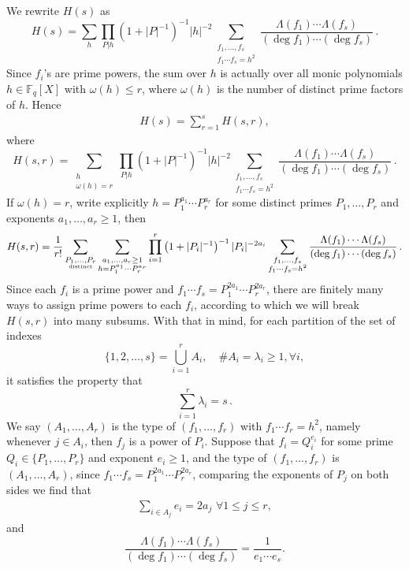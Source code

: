\documentclass[12pt]{amsart}
\theoremstyle{plain}
\newcommand{\F}{{\mathbb F}_q}
\begin{document}
 We rewrite $H(s)$ as
\[H(s)=\sum_{h} \prod_{P|h}\left(1+|P|^{-1}\right)^{-1} |h|^{-2} \sum_{\substack{f_1, \ldots,f_s \\ f_1 \cdots f_s=h^2}} \frac{\Lambda(f_1) \cdots \Lambda(f_s)}{(\deg f_1) \cdots (\deg f_s)}\,.\]
Since $f_i$'s are prime powers, the sum over $h$ is actually over all monic polynomials $h \in \F[X]$ with $\omega(h) \le r$, where $\omega(h)$ is the number of distinct prime factors of $h$. Hence
\begin{eqnarray} \label{6:hss} H(s)=\sum_{r=1}^s H(s,r),\end{eqnarray}
where
\[H(s,r)=\sum_{\substack{h\\ \omega(h)=r}} \prod_{P|h}\left(1+|P|^{-1}\right)^{-1} |h|^{-2} \sum_{\substack{f_1, \ldots,f_s \\ f_1 \cdots f_s=h^2}} \frac{\Lambda(f_1) \cdots \Lambda(f_s)}{(\deg f_1) \cdots (\deg f_s)}\,.\]
If $\omega(h)=r$, write explicitly $h=P_1^{a_1}\cdots P_r^{a_r}$ for some distinct primes $P_1,\ldots,P_r$ and exponents $a_1,\ldots,a_r \ge 1$, then
\[H(s,r)=\frac{1}{r!}\sum_{\substack{P_1,\ldots,P_r\\ \mbox{\tiny distinct}}} \sum_{\substack{a_1,\ldots,a_r \ge 1\\ h=P_1^{a_1}\cdots P_r^{a_r}}}\prod_{i=1}^r\left(1+|P_i|^{-1}\right)^{-1}|P_i|^{-2a_i} \sum_{\substack{f_1, \ldots,f_s \\ f_1 \cdots f_s=h^2}} \frac{\Lambda(f_1) \cdots \Lambda(f_s)}{(\deg f_1) \cdots (\deg f_s)}\,.\]
Since each $f_i$ is a prime power and $f_1 \cdots f_s=P_1^{2a_1}\cdots P_r^{2a_r}$, there are finitely many ways to assign prime powers to each $f_i$, according to which we will break $H(s,r)$ into many subsums. With that in mind, for each partition of the set of indexes
\[\{1,2,\ldots,s\}=\bigcup_{i=1}^r A_i,\quad \#A_i=\lambda_i \ge 1, \forall i,\]
it satisfies the property that
\[\sum_{i=1}^r\lambda_i=s\,.\]
We say $(A_1,\ldots,A_r)$ is the type of $(f_1,\ldots,f_r)$ with $f_1 \cdots f_r=h^2$, namely whenever $j \in A_i$, then $f_j$ is a power of $P_i$. Suppose that $f_i=Q_i^{e_i}$ for some prime $Q_i \in \{P_1,\ldots,P_r\}$ and exponent $e_i \ge 1$, and the type of $(f_1,\ldots,f_r)$ is $(A_1,\ldots,A_r)$, since $f_1 \cdots f_s=P_1^{2a_1}\cdots P_r^{2a_r}$, comparing the exponents of $P_j$ on both sides we find that
\begin{eqnarray} \label{6:par} \sum_{i \in A_j}e_i=2a_j \,\, \forall 1 \le j \le r, \end{eqnarray}
and
\[\frac{\Lambda(f_1) \cdots \Lambda(f_s)}{(\deg f_1) \cdots (\deg f_s)}=\frac{1}{e_1 \cdots e_s}.\]
\end{document}

